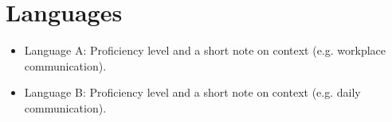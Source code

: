 \section{Languages}
\begin{itemize}[parsep=0.5ex]
  \item Language A: Proficiency level and a short note on context (e.g. workplace communication).
  \item Language B: Proficiency level and a short note on context (e.g. daily communication).
\end{itemize}
